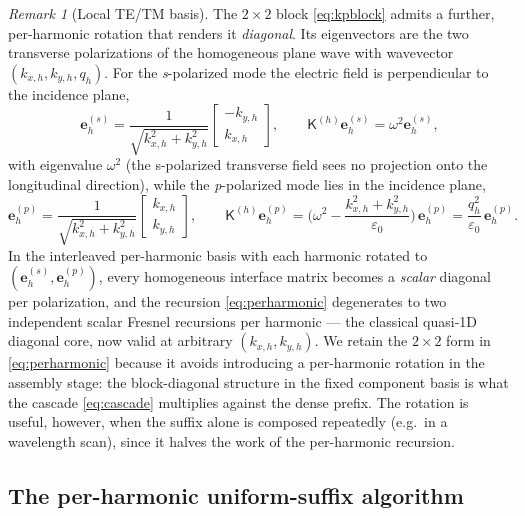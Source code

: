 \documentclass[11pt]{article}
\theoremstyle{remark}
\newtheorem{remark}[theorem]{Remark}
\newcommand{\eps}{\varepsilon}
\newcommand{\kp}{\mathsf{K}}
\begin{document}
\begin{remark}[Local TE/TM basis]\label{rem:tetm}
The $2\times2$ block \eqref{eq:kpblock} admits a further, per-harmonic
rotation that renders it \emph{diagonal}.  Its eigenvectors are the two
transverse polarizations of the homogeneous plane wave with wavevector
$(k_{x,h},k_{y,h},q_h)$.  For the \emph{s}-polarized mode the electric field
is perpendicular to the incidence plane,
\begin{equation}
\mathbf{e}^{(s)}_h=\frac{1}{\sqrt{k_{x,h}^2+k_{y,h}^2}}
\begin{bmatrix}-k_{y,h}\\ k_{x,h}\end{bmatrix},
\qquad
\kp^{(h)}\mathbf{e}^{(s)}_h=\omega^2\mathbf{e}^{(s)}_h,
\end{equation}
with eigenvalue $\omega^2$ (the s-polarized transverse field sees no
projection onto the longitudinal direction), while the \emph{p}-polarized mode
lies in the incidence plane,
\begin{equation}
\mathbf{e}^{(p)}_h=\frac{1}{\sqrt{k_{x,h}^2+k_{y,h}^2}}
\begin{bmatrix}k_{x,h}\\ k_{y,h}\end{bmatrix},
\qquad
\kp^{(h)}\mathbf{e}^{(p)}_h=\Big(\omega^2-\frac{k_{x,h}^2+k_{y,h}^2}{\eps_0}\Big)
\,\mathbf{e}^{(p)}_h=\frac{q_h^2}{\eps_0}\,\mathbf{e}^{(p)}_h.
\end{equation}
In the interleaved per-harmonic basis with each harmonic rotated to
$(\mathbf{e}^{(s)}_h,\mathbf{e}^{(p)}_h)$, every homogeneous interface matrix
becomes a \emph{scalar} diagonal per polarization, and the recursion
\eqref{eq:perharmonic} degenerates to two independent scalar Fresnel
recursions per harmonic --- the classical quasi-1D diagonal core, now valid at
arbitrary $(k_{x,h},k_{y,h})$.  We retain the $2\times2$ form in
\eqref{eq:perharmonic} because it avoids introducing a per-harmonic rotation
in the assembly stage: the block-diagonal structure in the fixed
component basis is what the cascade \eqref{eq:cascade} multiplies against the
dense prefix.  The rotation is useful, however, when the suffix alone is
composed repeatedly (e.g.\ in a wavelength scan), since it halves the work of
the per-harmonic recursion.
\end{remark}

\subsection{The per-harmonic uniform-suffix algorithm}
\label{sec:suffixalgo}
\end{document}
